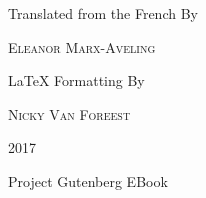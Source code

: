 \documentclass[a5paper]{book}
\begin{document}
\begin{titlepage}
	\vspace{1\baselineskip} %

	Translated from the French By \\
	
	\vspace{0.5\baselineskip} %
	
	{\scshape\large Eleanor Marx-Aveling \\} %

	\vspace{1\baselineskip} %

	\LaTeX\/ Formatting By \\
	
	\vspace{0.5\baselineskip} %
	
	{\scshape\large Nicky Van Foreest \\} %

	
	
	\vfill %
	
	
	
	\vspace{0.3\baselineskip} %
	
	2017 %
	
	{\large Project Gutenberg EBook} %

\end{titlepage}

\frontmatter
\tableofcontents


\clearpage

\mainmatter
\end{document}
